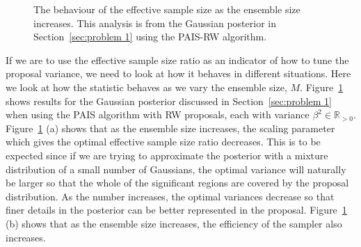 \documentclass[final]{siamltex}
\begin{document}
\begin{figure}[htb]
\centering
{}
\caption{The behaviour of the effective sample size as the ensemble size increases. This analysis is from the Gaussian posterior in Section~\ref{sec:problem 1} using the PAIS-RW algorithm.}
\label{fig:neff-M}
\end{figure}

If we are to use the effective sample size ratio as an indicator of
how to tune the proposal variance, we need to look at how it behaves
in different situations. Here we look at how the statistic behaves as
we vary the ensemble size, $M$. Figure~\ref{fig:neff-M} shows results
for the Gaussian posterior discussed in Section~\ref{sec:problem 1}
when using the PAIS algorithm with RW proposals, each with variance
$\beta^2 \in \mathbb{R}_{>0}$. Figure~\ref{fig:neff-M} (a) shows that
as the ensemble size increases, the scaling parameter which gives the
optimal effective sample size ratio decreases. This is to be expected
since if we are trying to approximate the posterior with a mixture
distribution of a small number of Gaussians, the optimal variance will
naturally be larger so that the whole of the significant regions are
covered by the proposal distribution. As the number increases, the
optimal variances decrease so that finer details in the posterior can
be better represented in the proposal. Figure~\ref{fig:neff-M} (b) shows that as the ensemble size increases, the efficiency of the sampler also increases.
\end{document}
